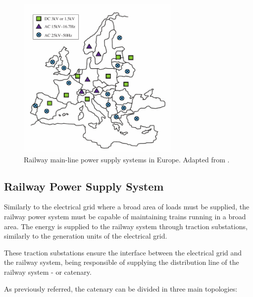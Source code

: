 \begin{figure}[h!]
	\centering
	\includegraphics[width=0.7\textwidth,keepaspectratio]{figures/31.PowerS/abad2016}
	\caption{Railway main-line power supply systems in Europe. Adapted from \cite{abad2016}.}
	\label{fig:abad2016}
\end{figure}



\subsection{Railway Power Supply System}
\label{subs:312}

Similarly to the electrical grid where a broad area of loads must be supplied, the railway power system must be capable of maintaining trains running in a broad area. The energy is supplied to the railway system through traction substations, similarly to the generation units of the electrical grid.

These traction substations ensure the interface between the electrical grid and the railway system, being responsible of supplying the distribution line of the railway system - or catenary.

As previously referred, the catenary can be divided in three main topologies:

%	
%	
%	
%

